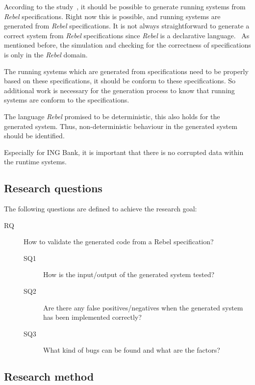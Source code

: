According to the study~\cite[p.~3]{stoelcase}, it should be possible to generate
running systems from \textit{Rebel} specifications. Right now this is possible, and
running systems are generated from \textit{Rebel} specifications. It is not always straightforward to generate a correct system from \textit{Rebel}
specifications since \textit{Rebel} is a declarative language.~\cite[p.~3]{stoelcase}
As mentioned before, the simulation and checking for the correctness of
specifications is only in the \textit{Rebel} domain.

The running systems which are
generated from specifications need to be properly based on these specifications,
it should be conform to these specifications. So additional work is necessary for
the generation process to know that running systems are conform to the
specifications.

The language \textit{Rebel} promised to be deterministic, this also holds
for the generated system. Thus, non-deterministic behaviour in the generated
system should be identified.

Especially for ING Bank, it is important that there is no corrupted data within
the runtime systems.

\subsection{Research questions}\label{sec:research-questions}
The following questions are defined to achieve the research goal:

\begin{description}
  \item [RQ] How to validate the generated code from a Rebel specification?

  \begin{description}
    \item [SQ1] How is the input/output of the generated system tested?
    \item [SQ2] Are there any false positives/negatives when the generated
    system has been implemented correctly?
    \item [SQ3] What kind of bugs can be found and what are the factors?
  \end{description}

\end{description}

\subsection{Research method}\label{sec:research-method}

